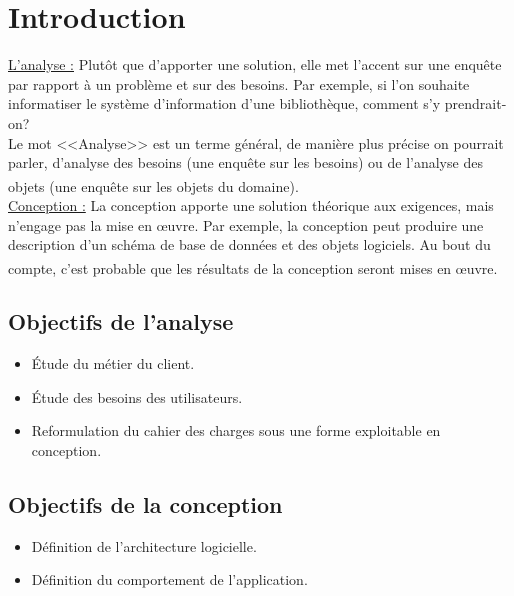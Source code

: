 \documentclass[12pt]{report}
\begin{document}
\newpage

\section{Introduction}
\vspace{0.2in}
\uline{L'analyse :} Plutôt que d’apporter une solution, elle met l’accent sur une enquête par rapport à un problème et sur des besoins. Par exemple, si l’on souhaite informatiser le système d’information d’une bibliothèque, comment s’y prendrait-on?
\\
Le mot <<Analyse>> est un terme général, de manière plus précise on pourrait parler, d’analyse des besoins (une enquête sur les besoins) ou de l’analyse des objets (une enquête sur les objets du domaine).\textsuperscript{\cite{UIS}}
\\
\uline{Conception :} La conception apporte une solution théorique aux exigences, mais n’engage pas la mise en œuvre. Par exemple, la conception peut produire une description d’un schéma de base de données et des objets logiciels. Au bout du compte, c’est probable que les résultats de la conception seront mises en œuvre.\textsuperscript{\cite{UIS}}

\vspace{-0.1in}

\subsection{Objectifs de l’analyse}
\begin{itemize}
    \item Étude du m\'etier du client.
    \item Étude des besoins des utilisateurs.
    \item Reformulation du cahier des charges sous une forme exploitable en conception.
\end{itemize}

\vspace{-0.15in}

\subsection{Objectifs de la conception}
\begin{itemize}
    \item D\'efinition de l’architecture logicielle.
    \item D\'efinition du comportement de l’application.
\end{itemize}
\end{document}
